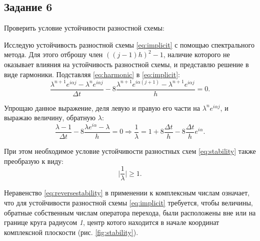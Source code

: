 \documentclass[12pt, a4paper]{report}
\begin{document}
	\subsection*{Задание 6}
	\large
	Проверить условие устойчивости разностной схемы: \par
	Исследую устойчивость разностной схемы \eqref{eq:implicit} с помощью спектрального метода. Для этого отброшу член $((j - 1)h)^{2} - 1$, наличие которого не оказывает влияния на устойчивость разностной схемы, и представлю решение в виде гармоники. Подставляя \eqref{eq:harmonic} в \eqref{eq:implicit}:
	\begin{equation*}
		\frac{\lambda^{n+1}e^{i \alpha j}-\lambda^{n}e^{i \alpha j}}{\Delta t} - 8\frac{\lambda^{n+1}e^{i \alpha (j + 1)}-\lambda^{n+1}e^{i \alpha j}}{h} = 0.
	\end{equation*}
	\par
	Упрощаю данное выражение, деля левую и правую его части на $\lambda^{n}e^{i \alpha j}$, и выражаю величину, обратную $\lambda$:
	\begin{equation*}
		\frac{\lambda - 1}{\Delta t} - 8\frac{\lambda e^{i \alpha} - \lambda}{h} = 0 \Rightarrow \frac{1}{\lambda} = 1 + 8\frac{\Delta t}{h} - 8\frac{\Delta t}{h}e^{i \alpha}.
	\end{equation*}
	\par
	При этом необходимое условие устойчивости разностных схем \eqref{eq:stability} также преобразую к виду:
	\begin{equation}\label{eq:reversestability}
		\lvert \frac{1}{\lambda} \rvert \geq 1.
	\end{equation}
	\par
	Неравенство \eqref{eq:reversestability} в применении к комплексным числам означает, что для устойчивости разностной схемы \eqref{eq:implicit} требуется, чтобы величины, обратные собственным числам оператора перехода, были расположены вне или на границе круга радиусом \textit{1}, центр котого находится в начале координат комплексной плоскости (рис. \ref{fig:stability}). \par
\end{document}
